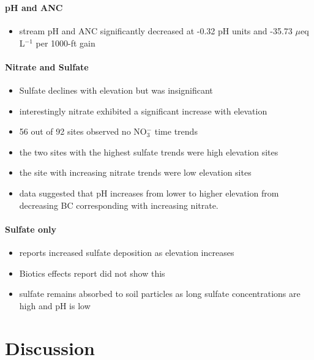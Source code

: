 \subsubsection{\citep{cai2012}}
\paragraph{pH and ANC}
\begin{itemize}	
	\item stream pH and ANC significantly decreased at -0.32 pH units and -35.73 $\mu$eq L$^{-1}$ per 1000-ft gain
\end{itemize}
\paragraph{Nitrate and Sulfate}
\begin{itemize}
	\item Sulfate declines with elevation but was insignificant
	\item interestingly nitrate exhibited a significant increase with elevation
	\item 56 out of 92 sites observed no NO$_3^-$ time trends
	\item the two sites with the highest sulfate trends were high elevation sites
	\item the site with increasing nitrate trends were low elevation sites
	\item data suggested that pH increases from lower to higher elevation from decreasing BC corresponding with increasing nitrate.%
\end{itemize}
\paragraph{Sulfate only}
\begin{itemize}
	\item \citet{weathers2006} reports increased sulfate deposition as elevation increases 
	\item Biotics effects report did not show this
	\item sulfate remains absorbed to soil particles as long sulfate concentrations are high and pH is low
\end{itemize}

\section{Discussion}

